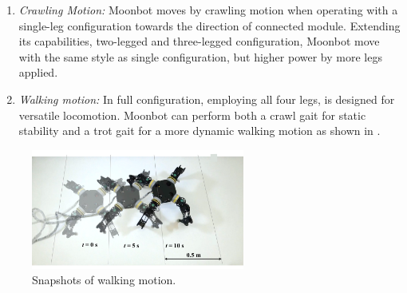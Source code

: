 \documentclass[a4paper,10pt,twocolumn]{jsarticle}
\begin{document}

\label{enumerate}
\begin{enumerate}
\item \textit{Crawling Motion:}
Moonbot moves by crawling motion when operating with a single-leg configuration towards the direction of connected module. Extending its capabilities, two-legged and three-legged configuration, Moonbot move with the same style as single configuration, but higher power by more legs applied.\\

\item \textit {Walking motion:}
In full configuration, employing all four legs, is designed for versatile locomotion. Moonbot can perform both a crawl gait for static stability and a trot gait for a more dynamic walking motion as shown in . 
\end{enumerate}

\begin{figure}[t]
  \centering
  \includegraphics[width=70mm]{./fig/snapshot/full_snapshot_finaltrot.png}
  \caption{Snapshots of walking motion.}\label{fig5fullsnap}
\end{figure}
\end{document}
